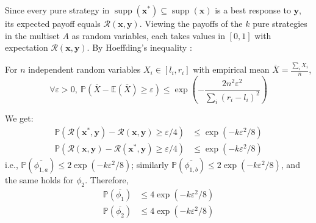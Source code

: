 Since every pure strategy in $\operatorname{supp}(\mathbf{x}^*) \subseteq \operatorname{supp}(\mathbf{x})$ is a best response to $\mathbf{y}$, its expected payoff equals $\mathcal{R}(\mathbf{x}, \mathbf{y})$. Viewing the payoffs of the $k$ pure strategies in the multiset $A$ as random variables, each takes values in $[0, 1]$ with expectation $\mathcal{R}(\mathbf{x}, \mathbf{y})$. By Hoeffding's inequality \cite[Theorem~2]{hoeffding63}:

\begin{lemma}
  For $n$ independent random variables $X_i \in [l_i, r_i]$ with empirical mean $\overline{X} = \frac{\sum_{i} X_i}{n}$,
  \[
    \forall \varepsilon > 0,\ \mathbb{P}(\overline{X} - \mathbb{E}(\overline{X}) \ge \varepsilon) \le \exp\left( -\frac{2n^2\varepsilon^2}{\sum_{i} (r_i - l_i)^2} \right)
  \]
\end{lemma}

We get:
\begin{align*}
  \mathbb{P}(\mathcal{R}(\mathbf{x}^*, \mathbf{y}) - \mathcal{R}(\mathbf{x}, \mathbf{y}) \ge \varepsilon / 4) & \le \exp(-k\varepsilon^2 / 8) \\
  \mathbb{P}(\mathcal{R}(\mathbf{x}, \mathbf{y}) - \mathcal{R}(\mathbf{x}^*, \mathbf{y}) \ge \varepsilon / 4) & \le \exp(-k\varepsilon^2 / 8)
\end{align*}
i.e., $\mathbb{P}(\overline{\phi_{1, a}}) \le 2\exp(-k\varepsilon^2 / 8)$; similarly $\mathbb{P}(\overline{\phi_{1, b}}) \le 2\exp(-k\varepsilon^2 / 8)$, and the same holds for $\phi_2$. Therefore,
\begin{align*}
  \mathbb{P}(\overline{\phi_1}) & \le 4\exp(-k\varepsilon^2 / 8) \\
  \mathbb{P}(\overline{\phi_2}) & \le 4\exp(-k\varepsilon^2 / 8)
\end{align*}

